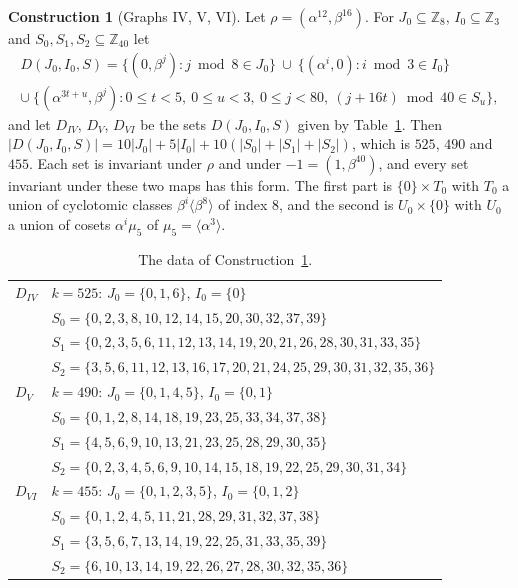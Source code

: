\documentclass[11pt]{amsart}
\theoremstyle{definition}
\newtheorem{construction}[theorem]{Construction}
\newcommand{\Z}{\mathbb{Z}}
\begin{document}
\begin{construction}[Graphs IV, V, VI]\label{con:IVVI}
Let $\rho=(\alpha^{12},\beta^{16})$. For $J_0\subseteq\Z_8$, $I_0\subseteq\Z_3$ and $S_0,S_1,S_2\subseteq\Z_{40}$ let
\begin{multline*}
D(J_0,I_0,S)=\{(0,\beta^j):j\bmod 8\in J_0\}\ \cup\ \{(\alpha^i,0):i\bmod 3\in I_0\}\\
\cup\ \bigl\{(\alpha^{3t+u},\beta^j):0\le t<5,\ 0\le u<3,\ 0\le j<80,\ (j+16t)\bmod 40\in S_u\bigr\},
\end{multline*}
and let $D_{IV}$, $D_V$, $D_{VI}$ be the sets $D(J_0,I_0,S)$ given by Table~\ref{tab:IVVI}. Then $|D(J_0,I_0,S)|=10|J_0|+5|I_0|+10(|S_0|+|S_1|+|S_2|)$, which is $525$, $490$ and $455$. Each set is invariant under $\rho$ and under $-1=(1,\beta^{40})$, and every set invariant under these two maps has this form. The first part is $\{0\}\times T_0$ with $T_0$ a union of cyclotomic classes $\beta^i\langle\beta^8\rangle$ of index $8$, and the second is $U_0\times\{0\}$ with $U_0$ a union of cosets $\alpha^i\mu_5$ of $\mu_5=\langle\alpha^3\rangle$.
\end{construction}

\begin{table}[ht]
\centering\small
\caption{The data of Construction~\ref{con:IVVI}.}\label{tab:IVVI}
\begin{tabular}{ll}
\toprule
$D_{IV}$ & $k=525$: \quad $J_0=\{0,1,6\}$, \quad $I_0=\{0\}$\\
 & $S_0=\{0,2,3,8,10,12,14,15,20,30,32,37,39\}$\\
 & $S_1=\{0,2,3,5,6,11,12,13,14,19,20,21,26,28,30,31,33,35\}$\\
 & $S_2=\{3,5,6,11,12,13,16,17,20,21,24,25,29,30,31,32,35,36\}$\\
\midrule
$D_{V}$ & $k=490$: \quad $J_0=\{0,1,4,5\}$, \quad $I_0=\{0,1\}$\\
 & $S_0=\{0,1,2,8,14,18,19,23,25,33,34,37,38\}$\\
 & $S_1=\{4,5,6,9,10,13,21,23,25,28,29,30,35\}$\\
 & $S_2=\{0,2,3,4,5,6,9,10,14,15,18,19,22,25,29,30,31,34\}$\\
\midrule
$D_{VI}$ & $k=455$: \quad $J_0=\{0,1,2,3,5\}$, \quad $I_0=\{0,1,2\}$\\
 & $S_0=\{0,1,2,4,5,11,21,28,29,31,32,37,38\}$\\
 & $S_1=\{3,5,6,7,13,14,19,22,25,31,33,35,39\}$\\
 & $S_2=\{6,10,13,14,19,22,26,27,28,30,32,35,36\}$\\
\bottomrule
\end{tabular}
\end{table}
\end{document}
